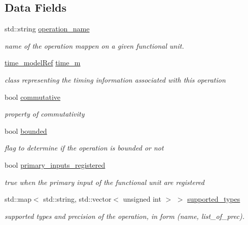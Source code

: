 \subsection*{Data Fields}
\begin{DoxyCompactItemize}
\item 
std\+::string \hyperlink{structoperation_af5a268de2cc56a57805b2e316349dccd}{operation\+\_\+name}
\begin{DoxyCompactList}\small\item\em name of the operation mappen on a given functional unit. \end{DoxyCompactList}\item 
\hyperlink{time__model_8hpp_ae203bb7faf1c278333f76fcc6ebe412c}{time\+\_\+model\+Ref} \hyperlink{structoperation_a95c5d7de70dde9a2bc866123b301c154}{time\+\_\+m}
\begin{DoxyCompactList}\small\item\em class representing the timing information associated with this operation \end{DoxyCompactList}\item 
bool \hyperlink{structoperation_aa872c8588602ccb6d412b9d164eef46c}{commutative}
\begin{DoxyCompactList}\small\item\em property of commutativity \end{DoxyCompactList}\item 
bool \hyperlink{structoperation_a34c154bf0f9db4968c37f6770be3b58f}{bounded}
\begin{DoxyCompactList}\small\item\em flag to determine if the operation is bounded or not \end{DoxyCompactList}\item 
bool \hyperlink{structoperation_a9fae9437b8ca1d72d15b692e0d095c8d}{primary\+\_\+inputs\+\_\+registered}
\begin{DoxyCompactList}\small\item\em true when the primary input of the functional unit are registered \end{DoxyCompactList}\item 
std\+::map$<$ std\+::string, std\+::vector$<$ unsigned int $>$ $>$ \hyperlink{structoperation_aaf4ee4678115f720880e7788a4b9be26}{supported\+\_\+types}
\begin{DoxyCompactList}\small\item\em supported types and precision of the operation, in form (name, list\+\_\+of\+\_\+prec). \end{DoxyCompactList}\item 

\end{DoxyCompactItemize}

